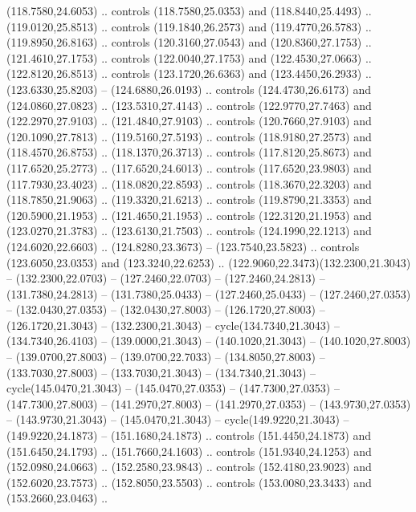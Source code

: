 \begin{scope}[cm={{1.25,0.0,0.0,-1.25,(0.0,59.09163)}}]
        (118.7580,24.6053) .. controls (118.7580,25.0353) and (118.8440,25.4493) ..
        (119.0120,25.8513) .. controls (119.1840,26.2573) and (119.4770,26.5783) ..
        (119.8950,26.8163) .. controls (120.3160,27.0543) and (120.8360,27.1753) ..
        (121.4610,27.1753) .. controls (122.0040,27.1753) and (122.4530,27.0663) ..
        (122.8120,26.8513) .. controls (123.1720,26.6363) and (123.4450,26.2933) ..
        (123.6330,25.8203) -- (124.6880,26.0193) .. controls (124.4730,26.6173) and
        (124.0860,27.0823) .. (123.5310,27.4143) .. controls (122.9770,27.7463) and
        (122.2970,27.9103) .. (121.4840,27.9103) .. controls (120.7660,27.9103) and
        (120.1090,27.7813) .. (119.5160,27.5193) .. controls (118.9180,27.2573) and
        (118.4570,26.8753) .. (118.1370,26.3713) .. controls (117.8120,25.8673) and
        (117.6520,25.2773) .. (117.6520,24.6013) .. controls (117.6520,23.9803) and
        (117.7930,23.4023) .. (118.0820,22.8593) .. controls (118.3670,22.3203) and
        (118.7850,21.9063) .. (119.3320,21.6213) .. controls (119.8790,21.3353) and
        (120.5900,21.1953) .. (121.4650,21.1953) .. controls (122.3120,21.1953) and
        (123.0270,21.3783) .. (123.6130,21.7503) .. controls (124.1990,22.1213) and
        (124.6020,22.6603) .. (124.8280,23.3673) -- (123.7540,23.5823) .. controls
        (123.6050,23.0353) and (123.3240,22.6253) ..
        (122.9060,22.3473)(132.2300,21.3043) -- (132.2300,22.0703) --
        (127.2460,22.0703) -- (127.2460,24.2813) -- (131.7380,24.2813) --
        (131.7380,25.0433) -- (127.2460,25.0433) -- (127.2460,27.0353) --
        (132.0430,27.0353) -- (132.0430,27.8003) -- (126.1720,27.8003) --
        (126.1720,21.3043) -- (132.2300,21.3043) -- cycle(134.7340,21.3043) --
        (134.7340,26.4103) -- (139.0000,21.3043) -- (140.1020,21.3043) --
        (140.1020,27.8003) -- (139.0700,27.8003) -- (139.0700,22.7033) --
        (134.8050,27.8003) -- (133.7030,27.8003) -- (133.7030,21.3043) --
        (134.7340,21.3043) -- cycle(145.0470,21.3043) -- (145.0470,27.0353) --
        (147.7300,27.0353) -- (147.7300,27.8003) -- (141.2970,27.8003) --
        (141.2970,27.0353) -- (143.9730,27.0353) -- (143.9730,21.3043) --
        (145.0470,21.3043) -- cycle(149.9220,21.3043) -- (149.9220,24.1873) --
        (151.1680,24.1873) .. controls (151.4450,24.1873) and (151.6450,24.1793) ..
        (151.7660,24.1603) .. controls (151.9340,24.1253) and (152.0980,24.0663) ..
        (152.2580,23.9843) .. controls (152.4180,23.9023) and (152.6020,23.7573) ..
        (152.8050,23.5503) .. controls (153.0080,23.3433) and (153.2660,23.0463) ..

\end{scope}
